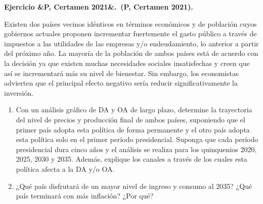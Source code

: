 \documentclass[11pt]{article}
\newcounter{ejercicio}
\newcommand{\ejercicio}[1][]{%
  \stepcounter{ejercicio}%
  \bigskip\noindent\textbf{Ejercicio \arabic{ejercicio}\ifx&#1&\relax.\else\ (#1).\fi}\ %
}
\newenvironment{partes}
  {\begin{enumerate}[label=(\alph*), leftmargin=1.5cm]}
  {\end{enumerate}}
\begin{document}
\ejercicio[P, Certamen 2021]
Existen dos países vecinos idénticos en términos económicos y de población cuyos gobiernos actuales proponen incrementar fuertemente el gasto público a través de impuestos a las utilidades de las empresas y/o endeudamiento, lo anterior a partir del próximo año. La mayoría de la población de ambos países está de acuerdo con la decisión ya que existen muchas necesidades sociales insatisfechas y creen que así se incrementará más su nivel de bienestar. Sin embargo, los economistas advierten que el principal efecto negativo sería reducir significativamente la inversión.

\begin{partes}
    \item Con un análisis gráfico de DA y OA de largo plazo, determine la trayectoria del nivel de precios y producción final de ambos países, suponiendo que el primer país adopta esta política de forma permanente y el otro país adopta esta política solo en el primer período presidencial. Suponga que cada período presidencial dura cinco años y el análisis se realiza para los quinquenios 2020, 2025, 2030 y 2035. Además, explique los canales a través de los cuales esta política afecta a la DA y/o OA.
    \item ¿Qué país disfrutará de un mayor nivel de ingreso y consumo al 2035? ¿Qué país terminará con más inflación? ¿Por qué?
\end{partes}
\end{document}

